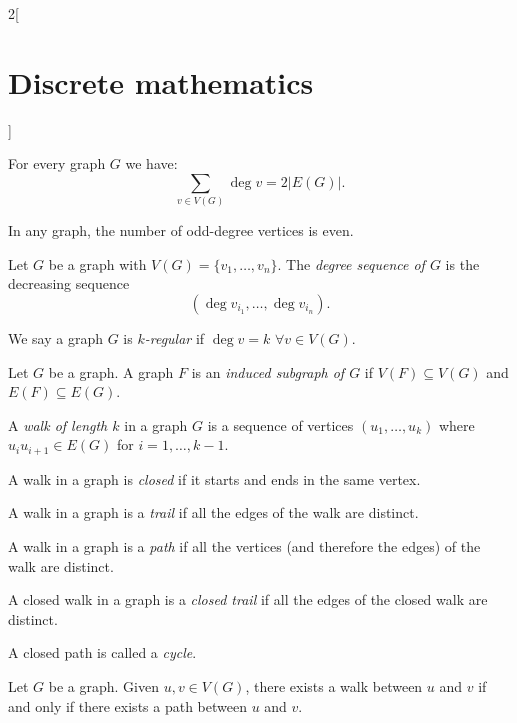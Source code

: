 \documentclass[../../../main.tex]{subfiles}
\begin{document}
\begin{multicols}{2}[\section{Discrete mathematics}]
\begin{lemma}
        For every graph $G$ we have: $$\sum_{v\in V(G)}\deg v=2|E(G)|.$$
    \end{lemma}
    \begin{corollary}
        In any graph, the number of odd-degree vertices is even.
    \end{corollary}
    \begin{definition}
        Let $G$ be a graph with $V(G)=\{v_1,\ldots,v_n\}$. The \textit{degree sequence of $G$} is the decreasing sequence $$(\deg v_{i_1},\ldots,\deg v_{i_n}).$$
    \end{definition}
    \begin{definition}
        We say a graph $G$ is \textit{$k$-regular} if $\deg v=k$ $\forall v\in V(G)$.
    \end{definition}
    \begin{definition}
        Let $G$ be a graph. A graph $F$ is an \textit{induced subgraph of $G$} if $V(F)\subseteq V(G)$ and $E(F)\subseteq E(G)$.
    \end{definition}
    \begin{definition}
        A \textit{walk of length $k$} in a graph $G$ is a sequence of vertices $(u_1,\ldots,u_k)$ where $u_iu_{i+1}\in E(G)$ for $i=1,\ldots,k-1$.
    \end{definition}
    \begin{definition}
        A walk in a graph is \textit{closed} if it starts and ends in the same vertex.
    \end{definition}
    \begin{definition}
        A walk in a graph is a \textit{trail} if all the edges of the walk are distinct.
    \end{definition}
    \begin{definition}
        A walk in a graph is a \textit{path} if all the vertices (and therefore the edges) of the walk are distinct.
    \end{definition}
    \begin{definition}
        A closed walk in a graph is a \textit{closed trail} if all the edges of the closed walk are distinct.
    \end{definition}
    \begin{definition}
        A closed path is called a \textit{cycle}.
    \end{definition}
    \begin{prop}
        Let $G$ be a graph. Given $u,v\in V(G)$, there exists a walk between $u$ and $v$ if and only if there exists a path between $u$ and $v$.

\end{prop}
\end{multicols}
\end{document}
